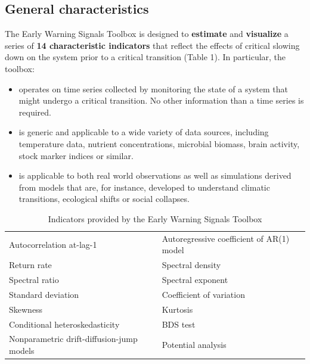 \documentclass[12pt,a4paper,final]{article}
\begin{document}
\subsection{General characteristics}
The Early Warning Signals Toolbox is designed to \textbf{estimate} and \textbf{visualize} a series of \textbf{14 characteristic indicators} that reflect the effects of critical slowing down on the system prior to a critical transition (Table 1). In particular, the toolbox:
\begin{itemize}
\item operates on time series collected by monitoring the state of a system that might undergo a critical transition. No other information than a time series is required. 
\item is generic and applicable to a wide variety of data sources, including temperature data, nutrient concentrations, microbial biomass, brain activity, stock marker indices or similar.
\item is applicable to both real world observations as well as simulations derived from models that are, for instance, developed to understand climatic transitions, ecological shifts or social collapses.
\end{itemize}


\begin{table}[h]
\centering
\caption{Indicators provided by the Early Warning Signals Toolbox}%
\begin{tabular}{l l}%
\hline
\hline
Autocorrelation at-lag-1 &	%
Autoregressive coefficient of AR(1) model	\\ %
Return rate &	%
Spectral density \\%
Spectral ratio &	%
Spectral exponent\\	%
Standard deviation &	%
Coefficient of variation\\	%
Skewness &	%
Kurtosis	\\%
Conditional heteroskedasticity	&%
BDS test	\\%
Nonparametric drift-diffusion-jump models	&%
Potential analysis	\\ [0.5ex]%
\hline
\hline
\end{tabular}
\label{methods_table}
\end{table}%
\end{document}

